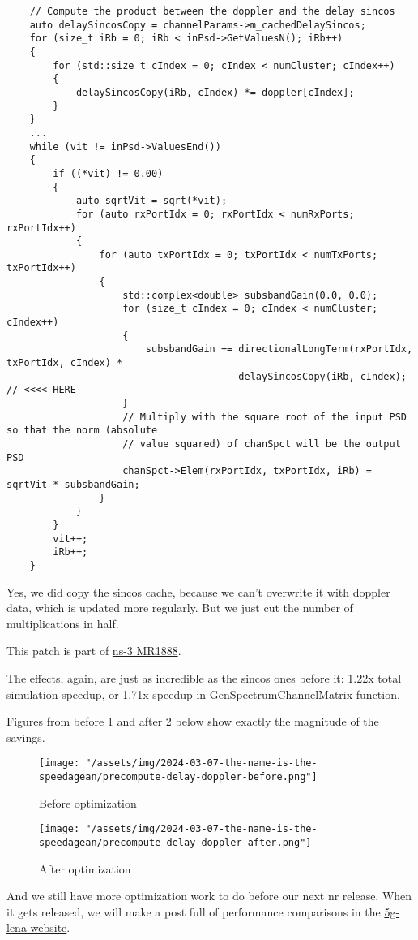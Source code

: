 \documentclass{article}
\begin{document}
\begin{lstlisting}
    // Compute the product between the doppler and the delay sincos
    auto delaySincosCopy = channelParams->m_cachedDelaySincos;
    for (size_t iRb = 0; iRb < inPsd->GetValuesN(); iRb++)
    {
        for (std::size_t cIndex = 0; cIndex < numCluster; cIndex++)
        {
            delaySincosCopy(iRb, cIndex) *= doppler[cIndex];
        }
    }
    ...
    while (vit != inPsd->ValuesEnd())
    {
        if ((*vit) != 0.00)
        {
            auto sqrtVit = sqrt(*vit);
            for (auto rxPortIdx = 0; rxPortIdx < numRxPorts; rxPortIdx++)
            {
                for (auto txPortIdx = 0; txPortIdx < numTxPorts; txPortIdx++)
                {
                    std::complex<double> subsbandGain(0.0, 0.0);
                    for (size_t cIndex = 0; cIndex < numCluster; cIndex++)
                    {
                        subsbandGain += directionalLongTerm(rxPortIdx, txPortIdx, cIndex) *
                                        delaySincosCopy(iRb, cIndex); // <<<< HERE
                    }
                    // Multiply with the square root of the input PSD so that the norm (absolute
                    // value squared) of chanSpct will be the output PSD
                    chanSpct->Elem(rxPortIdx, txPortIdx, iRb) = sqrtVit * subsbandGain;
                }
            }
        }
        vit++;
        iRb++;
    }
\end{lstlisting}

Yes, we did copy the sincos cache, because we can't overwrite it with doppler data,
which is updated more regularly. But we just cut the number of multiplications in half.

This patch is part of \href{https://gitlab.com/nsnam/ns-3-dev/-/merge_requests/1888}{ns-3 MR1888}.

The effects, again, are just as incredible as the sincos ones before it:
1.22x total simulation speedup, or 1.71x speedup in GenSpectrumChannelMatrix function.

Figures from before \ref{fig:precompute-delay-doppler-before} and after \ref{fig:precompute-delay-doppler-after} below show exactly the magnitude of the savings.

\begin{figure}
    \texttt{[image: "/assets/img/2024-03-07-the-name-is-the-speedagean/precompute-delay-doppler-before.png"]}
    \caption{Before optimization}
    \label{fig:precompute-delay-doppler-before}
\end{figure}

\begin{figure}
    \texttt{[image: "/assets/img/2024-03-07-the-name-is-the-speedagean/precompute-delay-doppler-after.png"]}
    \caption{After optimization}
    \label{fig:precompute-delay-doppler-after}
\end{figure}

And we still have more optimization work to do before our next nr release.
When it gets released, we will make a post full of performance comparisons in the \href{https://5g-lena.cttc.es/}{5g-lena website}.
\end{document}
